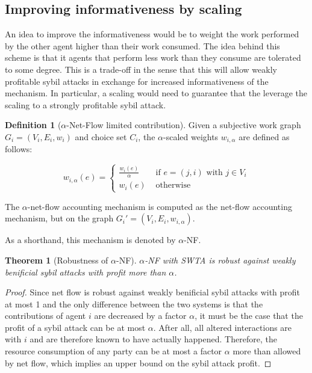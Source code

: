 \documentclass[a4paper,11pt]{book}
\newtheorem{theorem}{Theorem}
\theoremstyle{definition}
\newtheorem{definition}{Definition}
\begin{document}
\subsection{Improving informativeness by scaling}
An idea to improve the informativeness would be to weight the work performed by the other
agent higher than their work consumed. The idea behind this scheme is that it agents
that perform less work than they consume are tolerated to some degree. This is a trade-off
in the sense that this will allow weakly profitable sybil attacks in exchange for increased
informativeness of the mechanism. In particular, a scaling would need to guarantee
that the leverage the scaling to a strongly profitable sybil attack. 

\begin{definition}[$\alpha$-Net-Flow limited contribution]
    Given a subjective work graph $G_i = (V_i, E_i, w_i)$ and choice set $C_i$, the $\alpha$-scaled
    weights $w_{i,\alpha}$ are defined as follows:

    \begin{equation*}
        w_{i,\alpha}(e) = 
        \begin{cases}
            \frac{w_i(e)}{\alpha} &\mbox{ if } e = (j, i) \mbox{ with } j \in V_i \\
            w_i(e) &\mbox{ otherwise}
        \end{cases}
    \end{equation*}
    
    The $\alpha$-net-flow accounting mechanism is computed as the net-flow accounting
    mechanism, but on the graph $G_i' = (V_i, E_i, w_{i,\alpha})$.

    As a shorthand, this mechanism is denoted by $\alpha$-NF.
\end{definition}

\begin{theorem}[Robustness of $\alpha$-NF]
    $\alpha$-NF with SWTA is robust against weakly benificial sybil attacks with
    profit more than $\alpha$.
    \label{thm:sybil-anf}
\end{theorem}

\begin{proof}
    Since net flow is robust against weakly benificial sybil attacks with profit at most
    1 and the only difference between the two systems is that the contributions of
    agent $i$ are decreased by a factor $\alpha$, it must be the case that the profit
    of a sybil attack can be at most $\alpha$. After all, all altered interactions
    are with $i$ and are therefore known to have actually happened. Therefore, the
    resource consumption of any party can be at most a factor $\alpha$ more than allowed
    by net flow, which implies an upper bound on the sybil attack profit.
\end{proof}
\end{document}

